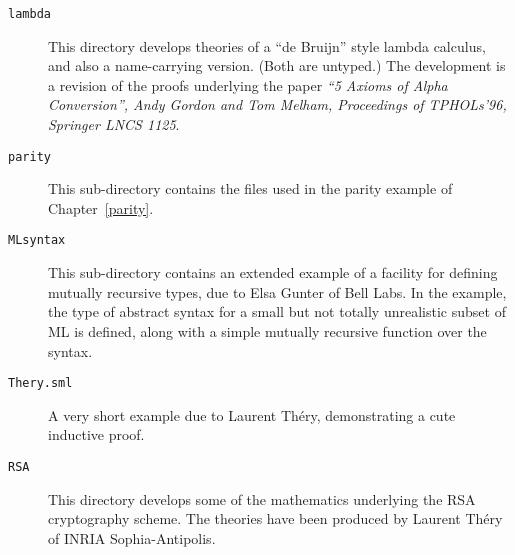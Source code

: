 \begin{description}
\item[\tt lambda]

This directory develops theories of a ``de Bruijn'' style lambda calculus,
and also a name-carrying version. (Both are untyped.) The development
is a revision of the proofs underlying the paper
{\it ``5 Axioms of Alpha Conversion'',
            Andy Gordon and Tom Melham,
            Proceedings of TPHOLs'96, Springer LNCS 1125}.

\item[\tt parity]

  This sub-directory contains the files used in the parity example of
  Chapter~\ref{parity}.

\item [\tt MLsyntax]

  This sub-directory contains an extended example of a facility for
  defining mutually recursive types, due to Elsa Gunter of Bell Labs.
  In the example, the type of abstract syntax for a small but not
  totally unrealistic subset of ML is defined, along with a simple
  mutually recursive function over the syntax.

\item[\tt Thery.sml]

  A very short example due to Laurent Th\'ery, demonstrating a cute
  inductive proof.

\item[\tt RSA]

       This directory develops some of the mathematics underlying
       the RSA cryptography scheme. The theories have been
       produced by Laurent Th\'ery of INRIA Sophia-Antipolis.

\end{description}


